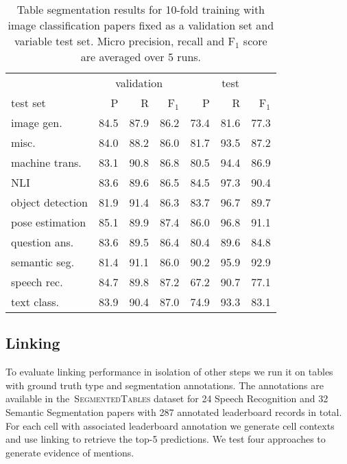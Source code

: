\documentclass[11pt,a4paper]{article}
\newcommand{\finegrained}{\textsc{SegmentedTables}}
\begin{document}
\begin{table}[t]
\small
    \centering
    \setlength{\tabcolsep}{4pt}
    \caption{Table segmentation results for 10-fold training with image classification papers fixed as a validation set and variable test set. Micro precision, recall and F$_1$ score are averaged over 5 runs.}
    \label{tab:results:segmentation:kfolds}
    \begin{tabular}{lrrrrrr}
     \toprule
     & \multicolumn{3}{c}{validation} & \multicolumn{3}{c}{test}\\
     \cmidrule(lr){2-4}\cmidrule(lr){5-7}
 test set & P & R & F$_1$ & P & R & F$_1$ \\\midrule
image gen.       &       84.5 &    87.9 & 86.2 &       73.4 &    81.6 & 77.3 \\
misc.            &       84.0 &    88.2 & 86.0 &       81.7 &    93.5 & 87.2 \\
machine trans.   &       83.1 &    90.8 & 86.8 &       80.5 &    94.4 & 86.9 \\
NLI              &       83.6 &    89.6 & 86.5 &       84.5 &    97.3 & 90.4 \\
object detection &       81.9 &    91.4 & 86.3 &       83.7 &    96.7 & 89.7 \\
pose estimation  &       85.1 &    89.9 & 87.4 &       86.0 &    96.8 & 91.1 \\
question ans.    &       83.6 &    89.5 & 86.4 &       80.4 &    89.6 & 84.8 \\
semantic seg.    &       81.4 &    91.1 & 86.0 &       90.2 &    95.9 & 92.9 \\
speech rec.      &       84.7 &    89.8 & 87.2 &       67.2 &    90.7 & 77.1 \\
text class.      &       83.9 &    90.4 & 87.0 &       74.9 &    93.3 & 83.1 \\
\bottomrule
    \end{tabular}
\end{table}

\subsection{Linking}
\label{sec:ablation:linking}
To evaluate linking performance in isolation of other steps we run it on tables with ground truth type and segmentation annotations. The annotations are available in the~\finegrained{} dataset for 24 Speech Recognition and 32 Semantic Segmentation papers with 287 annotated leaderboard records in total. For each cell with associated leaderboard annotation we generate cell contexts and use linking to retrieve the top-5 predictions.
We test four approaches to generate evidence of mentions.
\end{document}
